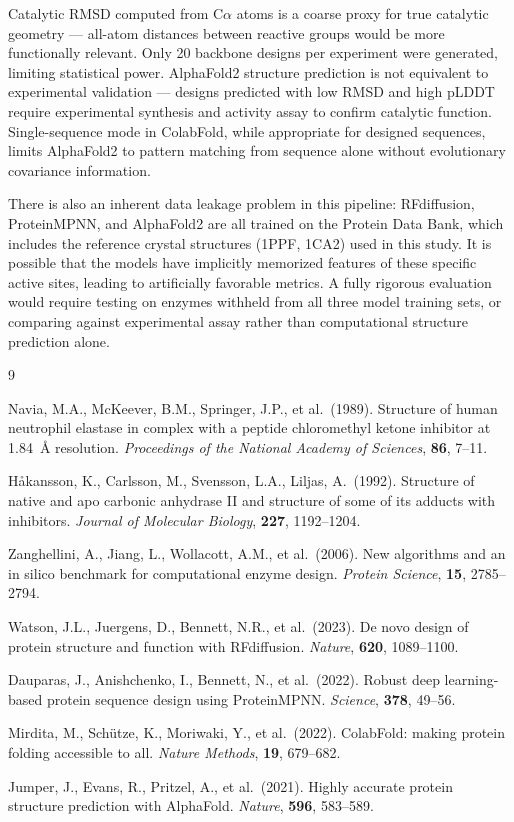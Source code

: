 \documentclass[11pt,letterpaper]{article}
\begin{document}
Catalytic RMSD computed from C$\alpha$ atoms is a coarse proxy for true catalytic geometry — all-atom distances between reactive groups would be more functionally relevant. Only 20 backbone designs per experiment were generated, limiting statistical power. AlphaFold2 structure prediction is not equivalent to experimental validation — designs predicted with low RMSD and high pLDDT require experimental synthesis and activity assay to confirm catalytic function. Single-sequence mode in ColabFold, while appropriate for designed sequences, limits AlphaFold2 to pattern matching from sequence alone without evolutionary covariance information.

There is also an inherent data leakage problem in this pipeline: RFdiffusion, ProteinMPNN, and AlphaFold2 are all trained on the Protein Data Bank, which includes the reference crystal structures (1PPF, 1CA2) used in this study. It is possible that the models have implicitly memorized features of these specific active sites, leading to artificially favorable metrics. A fully rigorous evaluation would require testing on enzymes withheld from all three model training sets, or comparing against experimental assay rather than computational structure prediction alone.

\clearpage
\begin{thebibliography}{9}

Navia, M.A., McKeever, B.M., Springer, J.P., et al.\ (1989). Structure of human neutrophil elastase in complex with a peptide chloromethyl ketone inhibitor at 1.84~\AA{} resolution. \textit{Proceedings of the National Academy of Sciences}, \textbf{86}, 7--11.

H\r{a}kansson, K., Carlsson, M., Svensson, L.A., Liljas, A.\ (1992). Structure of native and apo carbonic anhydrase II and structure of some of its adducts with inhibitors. \textit{Journal of Molecular Biology}, \textbf{227}, 1192--1204.

Zanghellini, A., Jiang, L., Wollacott, A.M., et al.\ (2006). New algorithms and an in silico benchmark for computational enzyme design. \textit{Protein Science}, \textbf{15}, 2785--2794.

Watson, J.L., Juergens, D., Bennett, N.R., et al.\ (2023). De novo design of protein structure and function with RFdiffusion. \textit{Nature}, \textbf{620}, 1089--1100.

Dauparas, J., Anishchenko, I., Bennett, N., et al.\ (2022). Robust deep learning-based protein sequence design using ProteinMPNN. \textit{Science}, \textbf{378}, 49--56.

Mirdita, M., Sch\"{u}tze, K., Moriwaki, Y., et al.\ (2022). ColabFold: making protein folding accessible to all. \textit{Nature Methods}, \textbf{19}, 679--682.

Jumper, J., Evans, R., Pritzel, A., et al.\ (2021). Highly accurate protein structure prediction with AlphaFold. \textit{Nature}, \textbf{596}, 583--589.

\end{thebibliography}
\end{document}
